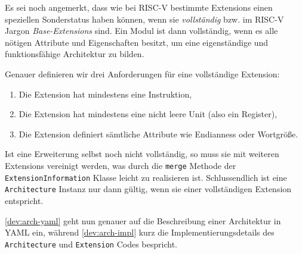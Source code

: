 Es sei noch angemerkt, dass wie bei RISC-V bestimmte Extensions einen speziellen
Sonderstatus haben können, wenn sie \emph{vollständig} bzw. im RISC-V Jargon
\emph{Base-Extensions} sind. Ein Modul ist dann vollständig, wenn es alle
nötigen Attribute und Eigenschaften besitzt, um eine eigenständige und
funktionsfähige Architektur zu bilden.

\pagebreak
Genauer definieren wir drei Anforderungen für eine vollständige Extension:

\begin{enumerate}
  \item Die Extension hat mindestens eine Instruktion,
  \item Die Extension hat mindestens eine nicht leere Unit (also ein Register),
  \item Die Extension definiert sämtliche Attribute wie Endianness oder Wortgröße.
\end{enumerate}

Ist eine Erweiterung selbst noch nicht vollständig, so muss sie mit weiteren
Extensions vereinigt werden, was durch die \texttt{merge}
Methode der \texttt{ExtensionInformation} Klasse leicht zu realisieren ist.
Schlussendlich ist eine \texttt{Architecture} Instanz nur dann gültig, wenn sie
einer vollständigen Extension entspricht.

\autoref{dev:arch-yaml} geht nun genauer auf die Beschreibung einer Architektur
in YAML ein, während \autoref{dev:arch-impl} kurz die Implementierungsdetails
des \texttt{Architecture} und \texttt{Extension} Codes bespricht.
